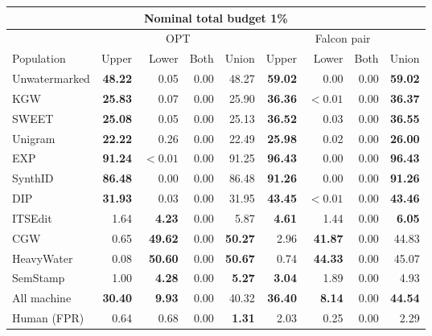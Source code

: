 \begin{tabular}{@{}lrrrrrrrr@{}}
\toprule
\multicolumn{9}{c}{Nominal total budget 1\%} \\
\midrule
 & \multicolumn{4}{c}{OPT} & \multicolumn{4}{c}{Falcon pair} \\
\cmidrule(lr){2-5}\cmidrule(l){6-9}
Population & Upper & Lower & Both & Union & Upper & Lower & Both & Union \\
\midrule
Unwatermarked & \textbf{48.22} & 0.05 & 0.00 & 48.27 & \textbf{59.02} & 0.00 & 0.00 & \textbf{59.02} \\
KGW & \textbf{25.83} & 0.07 & 0.00 & 25.90 & \textbf{36.36} & $<0.01$ & 0.00 & \textbf{36.37} \\
SWEET & \textbf{25.08} & 0.05 & 0.00 & 25.13 & \textbf{36.52} & 0.03 & 0.00 & \textbf{36.55} \\
Unigram & \textbf{22.22} & 0.26 & 0.00 & 22.49 & \textbf{25.98} & 0.02 & 0.00 & \textbf{26.00} \\
EXP & \textbf{91.24} & $<0.01$ & 0.00 & 91.25 & \textbf{96.43} & 0.00 & 0.00 & \textbf{96.43} \\
SynthID & \textbf{86.48} & 0.00 & 0.00 & 86.48 & \textbf{91.26} & 0.00 & 0.00 & \textbf{91.26} \\
DIP & \textbf{31.93} & 0.03 & 0.00 & 31.95 & \textbf{43.45} & $<0.01$ & 0.00 & \textbf{43.46} \\
ITSEdit & 1.64 & \textbf{4.23} & 0.00 & 5.87 & \textbf{4.61} & 1.44 & 0.00 & \textbf{6.05} \\
CGW & 0.65 & \textbf{49.62} & 0.00 & \textbf{50.27} & 2.96 & \textbf{41.87} & 0.00 & 44.83 \\
HeavyWater & 0.08 & \textbf{50.60} & 0.00 & \textbf{50.67} & 0.74 & \textbf{44.33} & 0.00 & 45.07 \\
SemStamp & 1.00 & \textbf{4.28} & 0.00 & \textbf{5.27} & \textbf{3.04} & 1.89 & 0.00 & 4.93 \\
\midrule
All machine & \textbf{30.40} & \textbf{9.93} & 0.00 & 40.32 & \textbf{36.40} & \textbf{8.14} & 0.00 & \textbf{44.54} \\
Human (FPR) & 0.64 & 0.68 & 0.00 & \textbf{1.31} & 2.03 & 0.25 & 0.00 & 2.29 \\
\bottomrule
\end{tabular}
